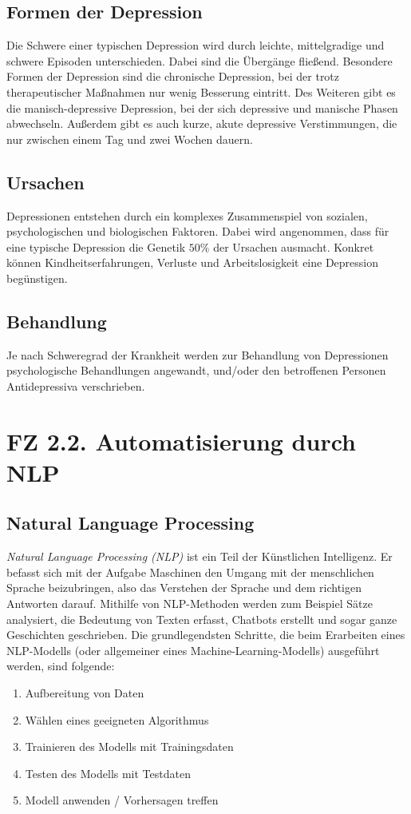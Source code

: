 \subsection{Formen der Depression}
Die Schwere einer typischen Depression wird durch leichte, mittelgradige und schwere Episoden unterschieden. Dabei sind die Übergänge fließend.
Besondere Formen der Depression sind die chronische Depression, bei der trotz therapeutischer Maßnahmen nur wenig Besserung eintritt. Des Weiteren gibt es die manisch-depressive Depression, bei der sich depressive und manische Phasen abwechseln. Außerdem gibt es auch kurze, akute depressive Verstimmungen, die nur zwischen einem Tag und zwei Wochen dauern. 

\subsection{Ursachen}
Depressionen entstehen durch ein komplexes Zusammenspiel von sozialen, psychologischen und biologischen Faktoren.
Dabei wird angenommen, dass für eine typische Depression die Genetik $50 \%$ der Ursachen ausmacht. 
Konkret können Kindheitserfahrungen, Verluste und Arbeitslosigkeit eine Depression begünstigen.

\subsection{Behandlung}
Je nach Schweregrad der Krankheit werden zur Behandlung von Depressionen psychologische Behandlungen angewandt, 
und/oder den betroffenen Personen Antidepressiva verschrieben.


%
%
\section{FZ 2.2. Automatisierung durch NLP}
\label{sec:fz2.2.} 

\subsection{Natural Language Processing}

\emph{Natural Language Processing (\ac{NLP})} ist ein Teil der Künstlichen Intelligenz. Er befasst sich mit der Aufgabe Maschinen den Umgang mit der menschlichen Sprache beizubringen, also das Verstehen der Sprache und dem richtigen Antworten darauf. Mithilfe von NLP-Methoden werden zum Beispiel Sätze analysiert, die Bedeutung von Texten erfasst, Chatbots erstellt und sogar ganze Geschichten geschrieben.
Die grundlegendsten Schritte, die beim Erarbeiten eines NLP-Modells (oder allgemeiner eines 
Machine-Learning-Modells) ausgeführt werden, sind folgende:
\begin{enumerate}
	\item Aufbereitung von Daten
	\item Wählen eines geeigneten Algorithmus
	\item Trainieren des Modells mit Trainingsdaten
	\item Testen des Modells mit Testdaten
	\item Modell anwenden / Vorhersagen treffen
\end{enumerate}

